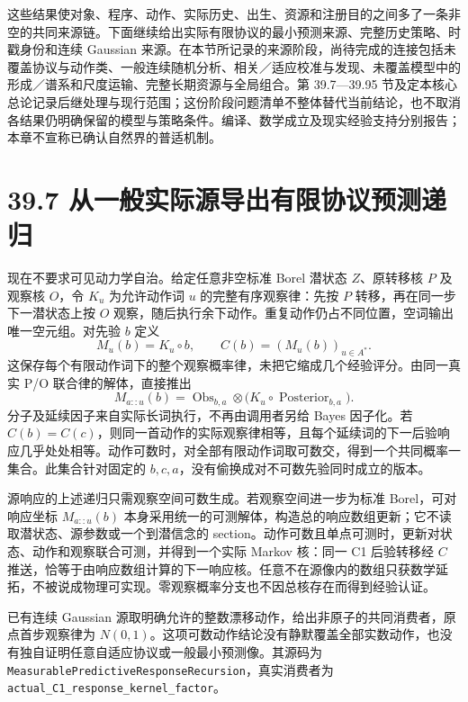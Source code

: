 \documentclass[
  11pt,
  oneside]{book}
\begin{document}
这些结果使对象、程序、动作、实际历史、出生、资源和注册目的之间多了一条非空的共同来源链。下面继续给出实际有限协议的最小预测来源、完整历史策略、时戳身份和连续 Gaussian 来源。在本节所记录的来源阶段，尚待完成的连接包括未覆盖协议与动作类、一般连续随机分析、相关／适应校准与发现、未覆盖模型中的形成／谱系和尺度运输、完整长期资源与全局组合。第 39.7---39.95 节及定本核心总论记录后继处理与现行范围；这份阶段问题清单不整体替代当前结论，也不取消各结果仍明确保留的模型与策略条件。编译、数学成立及现实经验支持分别报告；本章不宣称已确认自然界的普适机制。

\section{39.7 从一般实际源导出有限协议预测递归}\label{ux4eceux4e00ux822cux5b9eux9645ux6e90ux5bfcux51faux6709ux9650ux534fux8baeux9884ux6d4bux9012ux5f52}

现在不要求可见动力学自治。给定任意非空标准 Borel 潜状态 \(Z\)、原转移核 \(P\) 及观察核 \(O\)，令 \(K_u\) 为允许动作词 \(u\) 的完整有序观察律：先按 \(P\) 转移，再在同一步下一潜状态上按 \(O\) 观察，随后执行余下动作。重复动作仍占不同位置，空词输出唯一空元组。对先验 \(b\) 定义 \[M_u(b)=K_u\circ b,\qquad C(b)=(M_u(b))_{u\in A^*}.\] 这保存每个有限动作词下的整个观察概率律，未把它缩成几个经验评分。由同一真实 P/O 联合律的解体，直接推出 \[M_{a::u}(b)=\operatorname{Obs}_{b,a}\otimes
  \bigl(K_u\circ\operatorname{Posterior}_{b,a}\bigr).\] 分子及延续因子来自实际长词执行，不再由调用者另给 Bayes 因子化。若 \(C(b)=C(c)\)，则同一首动作的实际观察律相等，且每个延续词的下一后验响应几乎处处相等。动作可数时，对全部有限动作词取可数交，得到一个共同概率一集合。此集合针对固定的 \(b,c,a\)，没有偷换成对不可数先验同时成立的版本。

源响应的上述递归只需观察空间可数生成。若观察空间进一步为标准 Borel，可对响应坐标 \(M_{a::u}(b)\) 本身采用统一的可测解体，构造总的响应数组更新；它不读取潜状态、源参数或一个到潜信念的 section。动作可数且单点可测时，更新对状态、动作和观察联合可测，并得到一个实际 Markov 核：同一 C1 后验转移经 \(C\) 推送，恰等于由响应数组计算的下一响应核。任意不在源像内的数组只获数学延拓，不被说成物理可实现。零观察概率分支也不因总核存在而得到经验认证。

已有连续 Gaussian 源取明确允许的整数漂移动作，给出非原子的共同消费者，原点首步观察律为 \(N(0,1)\)。这项可数动作结论没有静默覆盖全部实数动作，也没有独自证明任意自适应协议或一般最小预测像。其源码为 \nolinkurl{MeasurablePredictiveResponseRecursion}，真实消费者为 \nolinkurl{actual_C1_response_kernel_factor}。
\end{document}
